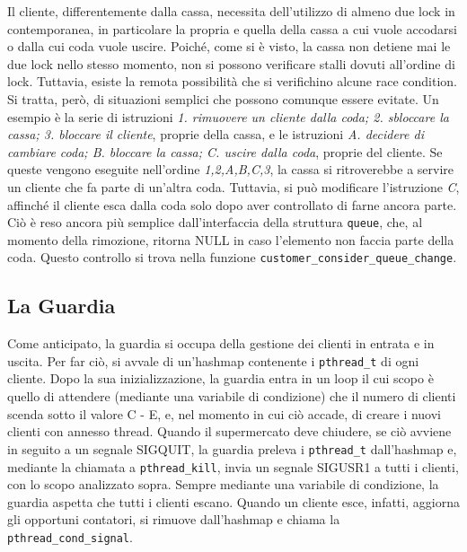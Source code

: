 \documentclass[a4paper,11pt] {article}
\begin{document}
Il cliente, differentemente dalla cassa, necessita dell'utilizzo di almeno due lock in contemporanea, in particolare la propria e quella della cassa a cui vuole accodarsi o dalla cui coda vuole uscire. Poiché, come si è visto, la cassa non detiene mai le due lock nello stesso momento, non si possono verificare stalli dovuti all'ordine di lock. Tuttavia, esiste la remota possibilità che si verifichino alcune race condition. Si tratta, però, di situazioni semplici che possono comunque essere evitate. Un esempio è la serie di istruzioni \textit{1. rimuovere un cliente dalla coda; 2. sbloccare la cassa; 3. bloccare il cliente}, proprie della cassa, e le istruzioni \textit{A. decidere di cambiare coda; B. bloccare la cassa; C. uscire dalla coda}, proprie del cliente. Se queste vengono eseguite nell'ordine \textit{1,2,A,B,C,3}, la cassa si ritroverebbe a servire un cliente che fa parte di un'altra coda. Tuttavia, si può modificare l'istruzione \textit{C}, affinché il cliente esca dalla coda solo dopo aver controllato di farne ancora parte. Ciò è reso ancora più semplice dall'interfaccia della struttura \lstinline{queue}, che, al momento della rimozione, ritorna NULL in caso l'elemento non faccia parte della coda. Questo controllo si trova nella funzione \lstinline{customer_consider_queue_change}.

\subsection*{La Guardia}

Come anticipato, la guardia si occupa della gestione dei clienti in entrata e in uscita. Per far ciò, si avvale di un'hashmap contenente i \lstinline{pthread_t} di ogni cliente. Dopo la sua inizializzazione, la guardia entra in un loop il cui scopo è quello di attendere (mediante una variabile di condizione) che il numero di clienti scenda sotto il valore C - E, e, nel momento in cui ciò accade, di creare i nuovi clienti con annesso thread. Quando il supermercato deve chiudere, se ciò avviene in seguito a un segnale SIGQUIT, la guardia preleva i \lstinline{pthread_t} dall'hashmap e, mediante la chiamata a \lstinline{pthread_kill}, invia un segnale SIGUSR1 a tutti i clienti, con lo scopo analizzato sopra. Sempre mediante una variabile di condizione, la guardia aspetta che tutti i clienti escano. Quando un cliente esce, infatti, aggiorna gli opportuni contatori, si rimuove dall'hashmap e chiama la \lstinline{pthread_cond_signal}.
\end{document}
